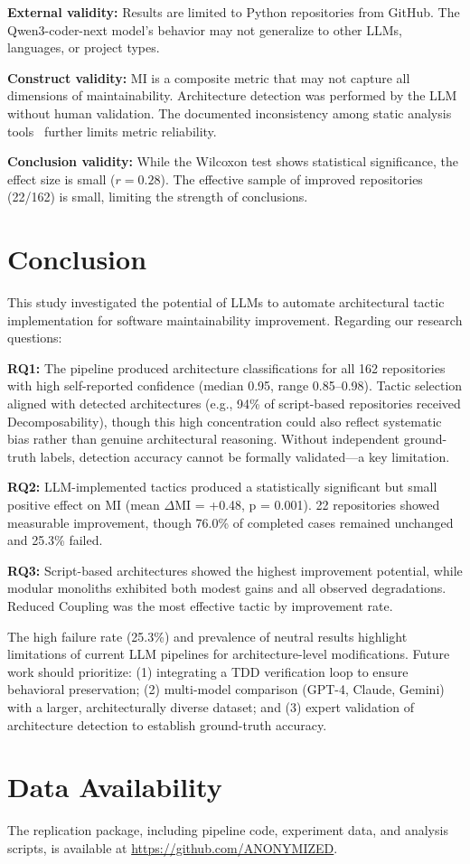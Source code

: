 \documentclass[sigconf,review,anonymous]{acmart}
\begin{document}
\textbf{External validity:} Results are limited to Python repositories from GitHub. The Qwen3-coder-next model's behavior may not generalize to other LLMs, languages, or project types.

\textbf{Construct validity:} MI is a composite metric that may not capture all dimensions of maintainability. Architecture detection was performed by the LLM without human validation. The documented inconsistency among static analysis tools~\cite{lenarduzzi2023critical} further limits metric reliability.

\textbf{Conclusion validity:} While the Wilcoxon test shows statistical significance, the effect size is small ($r = 0.28$). The effective sample of improved repositories (22/162) is small, limiting the strength of conclusions.

\section{Conclusion}

This study investigated the potential of LLMs to automate architectural tactic implementation for software maintainability improvement. Regarding our research questions:

\textbf{RQ1:} The pipeline produced architecture classifications for all 162 repositories with high self-reported confidence (median 0.95, range 0.85--0.98). Tactic selection aligned with detected architectures (e.g., 94\% of script-based repositories received Decomposability), though this high concentration could also reflect systematic bias rather than genuine architectural reasoning. Without independent ground-truth labels, detection accuracy cannot be formally validated---a key limitation.

\textbf{RQ2:} LLM-implemented tactics produced a statistically significant but small positive effect on MI (mean $\Delta$MI = +0.48, p = 0.001). 22 repositories showed measurable improvement, though 76.0\% of completed cases remained unchanged and 25.3\% failed.

\textbf{RQ3:} Script-based architectures showed the highest improvement potential, while modular monoliths exhibited both modest gains and all observed degradations. Reduced Coupling was the most effective tactic by improvement rate.

The high failure rate (25.3\%) and prevalence of neutral results highlight limitations of current LLM pipelines for architecture-level modifications. Future work should prioritize: (1) integrating a TDD verification loop to ensure behavioral preservation; (2) multi-model comparison (GPT-4, Claude, Gemini) with a larger, architecturally diverse dataset; and (3) expert validation of architecture detection to establish ground-truth accuracy.


\section*{Data Availability}
The replication package, including pipeline code, experiment data, and analysis scripts, is available at \url{https://github.com/ANONYMIZED}.


\end{document}
